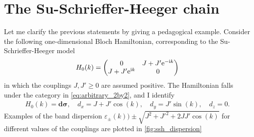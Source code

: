 \section{The Su-Schrieffer-Heeger chain}
\label{sec:the_SSH_chain}
%
%
Let me clarify the previous statements by giving a pedagogical example.
Consider the following one-dimensional Bloch Hamiltonian, corresponding to the Su-Schrieffer-Heeger model~\cite{Heeger1988}
\begin{align}
    H_0(k)
    =
    \begin{pmatrix}
        0 & J+J'\mathrm e^{-\mathrm i k}\\
        J+J'\mathrm e^{\mathrm i k} & 0
    \end{pmatrix}
\end{align}
in which the couplings $J,J'\geq0$ are assumed positive.
The Hamiltonian falls under the category in \ref{eq:arbitrary_2by2}, and I identify
\begin{align}
    H_0(k) = {\bm d}{\bm\sigma},
    \quad
    d_x = J+J'\cos(k),
    \quad
    d_y = J'\sin(k),
    \quad
    d_z = 0.
\end{align}
Examples of the band dispersion $\varepsilon_\pm(k))\pm\sqrt{J^2+J'^2+2JJ'\cos(k)}$ for different values of the couplings are plotted in \cref{fig:ssh_dispersion}
